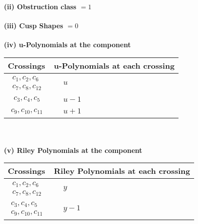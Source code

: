 \documentclass[1p]{elsarticle_modified}
\theoremstyle{definition}
\begin{document}
\flushleft \textbf{(ii) Obstruction class $= 1$}\\~\\
\flushleft \textbf{(iii) Cusp Shapes $= 0$}\\~\\
\newpage\renewcommand{\arraystretch}{1}
\flushleft \textbf{(iv) u-Polynomials at the component}\newline \\
\begin{tabular}{m{50pt}|m{274pt}}
Crossings & \hspace{64pt}u-Polynomials at each crossing \\
\hline $$\begin{aligned}c_{1},c_{2},c_{6}\\c_{7},c_{8},c_{12}\end{aligned}$$&$\begin{aligned}
&u
\end{aligned}$\\
\hline $$\begin{aligned}c_{3},c_{4},c_{5}\end{aligned}$$&$\begin{aligned}
&u-1
\end{aligned}$\\
\hline $$\begin{aligned}c_{9},c_{10},c_{11}\end{aligned}$$&$\begin{aligned}
&u+1
\end{aligned}$\\
\hline
\end{tabular}\\~\\
\newpage\renewcommand{\arraystretch}{1}
\flushleft \textbf{(v) Riley Polynomials at the component}\newline \\
\begin{tabular}{m{50pt}|m{274pt}}
Crossings & \hspace{64pt}Riley Polynomials at each crossing \\
\hline $$\begin{aligned}c_{1},c_{2},c_{6}\\c_{7},c_{8},c_{12}\end{aligned}$$&$\begin{aligned}
&y
\end{aligned}$\\
\hline $$\begin{aligned}c_{3},c_{4},c_{5}\\c_{9},c_{10},c_{11}\end{aligned}$$&$\begin{aligned}
&y-1
\end{aligned}$\\
\hline
\end{tabular}\\~\\
\end{document}
